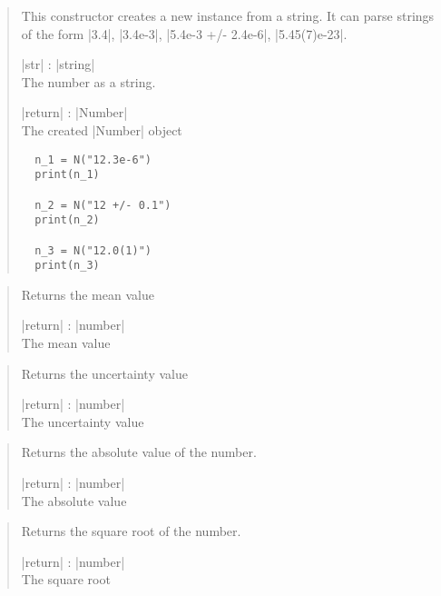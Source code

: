 \documentclass{ltxdoc}
\begin{document}
\begin{quote}
  This constructor creates a new instance from a string. It can parse strings of the form |3.4|, |3.4e-3|, |5.4e-3 +/- 2.4e-6|, |5.45(7)e-23|. 

  \subtitle{Parameters / Return}
  \begin{description}
  \item |str| : |string|\\
    The number as a string.

  \item |return| : |Number|\\
    The created |Number| object
  \end{description}

  \subtitle{Examples}
  \begin{lstlisting}
  n_1 = N("12.3e-6")
  print(n_1)

  n_2 = N("12 +/- 0.1")
  print(n_2)

  n_3 = N("12.0(1)")
  print(n_3)
  \end{lstlisting}
\end{quote}



\begin{quote}
  Returns the mean value

  \subtitle{Parameters / Return}
  \begin{description}
  \item |return| : |number|\\
    The mean value
  \end{description}
\end{quote}

\begin{quote}
  Returns the uncertainty value

  \subtitle{Parameters / Return}
  \begin{description}
  \item |return| : |number|\\
    The uncertainty value
  \end{description}
\end{quote}


\begin{quote}
  Returns the absolute value of the number.

  \subtitle{Parameters / Return}
  \begin{description}
  \item |return| : |number|\\
    The absolute value
  \end{description}
\end{quote}

\begin{quote}
  Returns the square root of the number.

  \subtitle{Parameters / Return}
  \begin{description}
  \item |return| : |number|\\
    The square root
  \end{description}
\end{quote}







\end{document}
